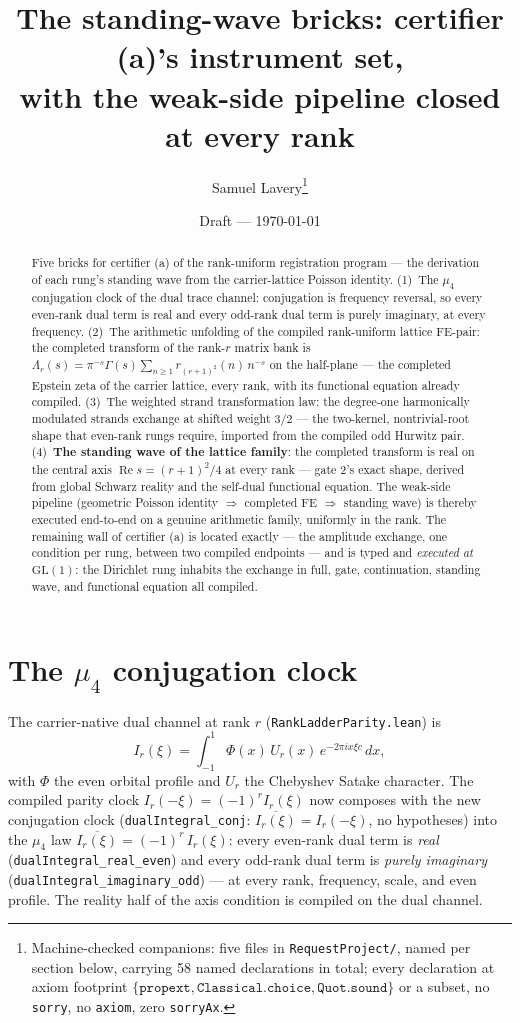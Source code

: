 \documentclass[11pt]{article}
\title{The standing-wave bricks: certifier (a)'s instrument set,\\
with the weak-side pipeline closed at every rank}
\author{Samuel Lavery\thanks{Machine-checked companions: five files in
\texttt{RequestProject/}, named per section below, carrying 58 named declarations in
total; every declaration at axiom footprint
$\{\texttt{propext},\texttt{Classical.choice},\texttt{Quot.sound}\}$ or a subset,
no \texttt{sorry}, no \texttt{axiom}, zero \texttt{sorryAx}.}}
\date{Draft --- \today}
\begin{document}
\maketitle

\begin{abstract}
Five bricks for certifier (a) of the rank-uniform registration program — the
derivation of each rung's standing wave from the carrier-lattice Poisson identity.  (1)~The $\mu_4$
conjugation clock of the dual trace channel: conjugation is frequency reversal, so
every even-rank dual term is real and every odd-rank dual term is purely imaginary, at
every frequency.  (2)~The arithmetic unfolding of the compiled rank-uniform lattice FE-pair:
the completed transform of the rank-$r$ matrix bank is
$\Lambda_r(s)=\pi^{-s}\Gamma(s)\sum_{n\ge1}r_{(r+1)^2}(n)\,n^{-s}$ on the half-plane —
the completed Epstein zeta of the carrier lattice, every rank, with its functional
equation already compiled.  (3)~The weighted strand transformation law: the degree-one harmonically
modulated strands exchange at shifted weight $3/2$ — the two-kernel, nontrivial-root
shape that even-rank rungs require, imported from the compiled odd Hurwitz pair.
(4)~\textbf{The standing wave of the lattice family}: the completed transform is real on
the central axis $\operatorname{Re}s=(r+1)^2/4$ at every rank — gate 2's exact shape,
derived from global Schwarz reality and the self-dual functional equation.  The
weak-side pipeline (geometric Poisson identity $\Rightarrow$ completed FE $\Rightarrow$ standing
wave) is thereby executed end-to-end on a genuine arithmetic family, uniformly in the
rank.  The remaining wall of certifier (a) is located exactly — the amplitude exchange,
one condition per rung, between two compiled endpoints — and is typed and
\emph{executed at} $\mathrm{GL}(1)$: the Dirichlet rung inhabits the exchange in
full, gate, continuation, standing wave, and functional equation all compiled.
\end{abstract}

\section{The $\mu_4$ conjugation clock}

The carrier-native dual channel at rank $r$
(\texttt{RankLadderParity.lean}) is
\[
I_r(\xi)=\int_{-1}^{1}\Phi(x)\,U_r(x)\,e^{-2\pi i x\xi c}\,dx,
\]
with $\Phi$ the even orbital profile and $U_r$ the Chebyshev Satake character.  The compiled parity clock
$I_r(-\xi)=(-1)^rI_r(\xi)$ now composes with the new conjugation clock
(\texttt{dualIntegral\_conj}: $\overline{I_r(\xi)}=I_r(-\xi)$, no hypotheses) into the
$\mu_4$ law $\overline{I_r(\xi)}=(-1)^r\,I_r(\xi)$: every even-rank dual
term is \emph{real} (\texttt{dualIntegral\_real\_even}) and every odd-rank dual
term is \emph{purely imaginary} (\texttt{dualIntegral\_imaginary\_odd}) — at every
rank, frequency, scale, and even profile.  The reality half of
the axis condition is compiled on the dual channel.
\end{document}
